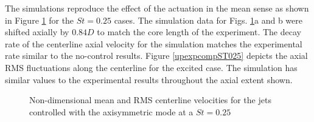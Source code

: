 \documentclass[english]{aiaa-tc}
\begin{document}
The simulations reproduce the effect of the actuation in the mean sense as shown in Figure \ref{expcompST025} for the $St=0.25$ cases. 
The simulation data for Figs. \ref{expcompST025}a and b were shifted axially by $0.84D$ to match the core length of the experiment. The decay rate of the centerline axial velocity for the simulation matches the experimental rate similar to the no-control results.  Figure \ref{upexpcompST025} depicts the axial RMS fluctuations along the centerline for the excited case. The simulation has similar values to the experimental results throughout the axial extent shown.
\begin{figure}
\begin{center}
\caption{Non-dimensional mean and RMS centerline velocities for the jets controlled with the axisymmetric mode at a $St=0.25$\label{expcompST025}}
\end{center}
 \end{figure}
\end{document}
